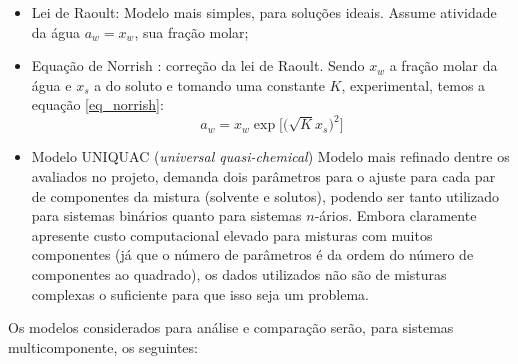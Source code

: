 \documentclass[
	12pt,				%
	openright,
	twoside,
	a4paper,			%
	english,			%
	french,				%
	spanish,			%
	brazil				%
	]{abntex2}
\begin{document}
\begin{itemize}
	\item Lei de Raoult: Modelo mais simples, para soluções ideais. Assume
		atividade da água $a_w = x_w$, sua fração molar;
	\item Equação de Norrish \cite{norrish1966}: correção da lei de Raoult.
		Sendo $x_w$ a fração molar da água e $x_s$ a do soluto e
		tomando uma constante $K$, experimental, temos a equação
		\ref{eq_norrish}:
		\begin{equation}
			\label{eq_norrish}
			a_w = x_w\exp\Big[\Big(\sqrt{K}x_s\Big)^2\Big]
		\end{equation}
	\item Modelo UNIQUAC (\textit{universal quasi-chemical})
		\cite{abrams1975} Modelo mais refinado dentre os avaliados no
		projeto, demanda dois parâmetros para o ajuste para cada par de
		componentes da mistura (solvente e solutos), podendo ser tanto
		utilizado para sistemas binários quanto para sistemas $n$-ários.
		Embora claramente apresente custo computacional elevado para
		misturas com muitos componentes (já que o número de parâmetros
		é da ordem do número de componentes ao quadrado), os dados
		utilizados não são de misturas complexas o suficiente para que
		isso seja um problema.
\end{itemize}

Os modelos considerados para análise e comparação serão, para sistemas
multicomponente, os seguintes:
\end{document}
